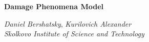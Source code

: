 \documentclass[letter,12pt, epsfig]{article}
\begin{document}
\newcommand{\beq}{\begin{equation}}
\newcommand{\eeq}{\end{equation}}
\newcommand{\bea}{\begin{eqnarray}}
\newcommand{\eea}{\end{eqnarray}}
\newcommand{\beas}{\begin{eqnarray*}}
\newcommand{\eeas}{\end{eqnarray*}}
\newcommand{\defi}{\stackrel{\rm def}{=}}
\newcommand{\non}{\nonumber}
\newcommand{\bquo}{\begin{quote}}
\newcommand{\enqu}{\end{quote}}

\hfill
\vspace{18pt}
\begin{center}
    \Large \textbf{Damage Phenomena Model}
\end{center}

\vspace{6pt}
\begin{center}
	\large\textsl{Daniel Bershatsky}, 
	\large\textsl{Kurilovich Alexander} \\
    \vspace{25pt}
    \textit{\small  Skolkovo Institute of Science and Technology}\\
    \vspace{6pt}
\end{center}

\vspace{12pt}
\vspace{4pt}



\vspace{1cm}





\begin{thebibliography}{23}

\end{thebibliography}
\end{document}
